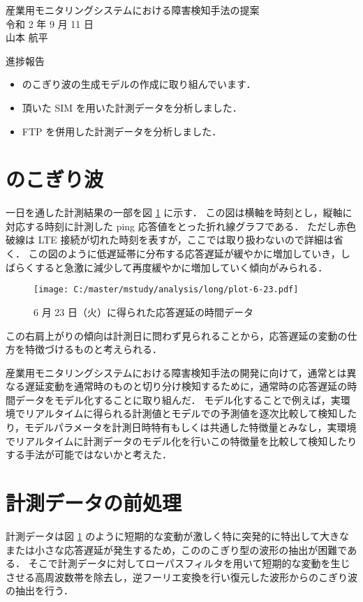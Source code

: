 \documentclass[a4j]{jarticle}
\begin{document}
\begin{table}[t]
\begin{center}
{\large 産業用モニタリングシステムにおける障害検知手法の提案}\\
令和 2 年 9 月 11 日\\
山本 航平
\end{center}
\end{table}

進捗報告
\begin{itemize}
\item のこぎり波の生成モデルの作成に取り組んでいます．
\item 頂いた SIM を用いた計測データを分析しました．
\item FTP を併用した計測データを分析しました．
\end{itemize}

\section{のこぎり波}
一日を通した計測結果の一部を図 \ref{rise} に示す．
この図は横軸を時刻とし，縦軸に対応する時刻に計測した ping 応答値をとった折れ線グラフである．
ただし赤色破線は LTE 接続が切れた時刻を表すが，ここでは取り扱わないので詳細は省く．
この図のように低遅延帯に分布する応答遅延が緩やかに増加していき，しばらくすると急激に減少して再度緩やかに増加していく傾向がみられる．
\begin{figure}[tb]
\begin{center}
\texttt{[image: C:/master/mstudy/analysis/long/plot-6-23.pdf]}
\caption{6 月 23 日（火）に得られた応答遅延の時間データ}
\label{rise}
\end{center}
\end{figure}
この右肩上がりの傾向は計測日に問わず見られることから，応答遅延の変動の仕方を特徴づけるものと考えられる．

産業用モニタリングシステムにおける障害検知手法の開発に向けて，通常とは異なる遅延変動を通常時のものと切り分け検知するために，通常時の応答遅延の時間データをモデル化することに取り組んだ．
モデル化することで例えば，実環境でリアルタイムに得られる計測値とモデルでの予測値を逐次比較して検知したり，モデルパラメータを計測日時特有もしくは共通した特徴量とみなし，実環境でリアルタイムに計測データのモデル化を行いこの特徴量を比較して検知したりする手法が可能ではないかと考えた．

\section{計測データの前処理}
計測データは図 \ref{rise} のように短期的な変動が激しく特に突発的に特出して大きなまたは小さな応答遅延が発生するため，こののこぎり型の波形の抽出が困難である．
そこで計測データに対してローパスフィルタを用いて短期的な変動を生じさせる高周波数帯を除去し，逆フーリエ変換を行い復元した波形からのこぎり波の抽出を行う．
\end{document}
